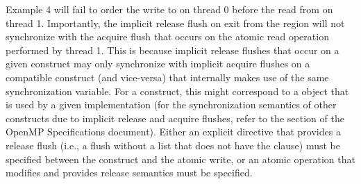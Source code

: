 

Example 4 will fail to order the write to  on thread 0 before the read
from  on thread 1. Importantly, the implicit release flush on exit from
the  region will not synchronize with the acquire flush that
occurs on the atomic read operation performed by thread 1. This is because
implicit release flushes that occur on a given construct may only synchronize
with implicit acquire flushes on a compatible construct (and vice-versa) that
internally makes use of the same synchronization variable. For a
 construct, this might correspond to a  object that
is used by a given implementation (for the synchronization semantics of other
constructs due to implicit release and acquire flushes, refer to the  section of the OpenMP Specifications document).  Either an explicit 
directive that provides a release flush (i.e., a flush without a list that does
not have the  clause) must be specified between the
 construct and the atomic write, or an atomic operation that
modifies  and provides release semantics must be specified.


